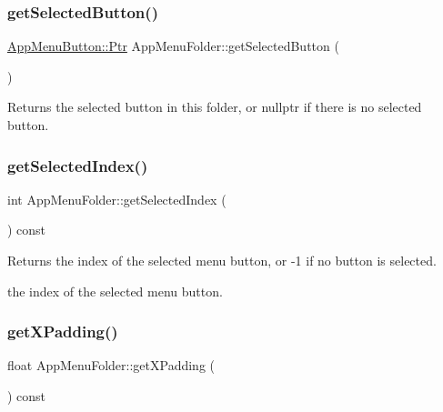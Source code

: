 \subsubsection{\texorpdfstring{get\+Selected\+Button()}{getSelectedButton()}}
{\footnotesize\ttfamily \mbox{\hyperlink{classAppMenuButton_aeb692efb6a933970de8eac14e5e71544}{App\+Menu\+Button\+::\+Ptr}} App\+Menu\+Folder\+::get\+Selected\+Button (\begin{DoxyParamCaption}{ }\end{DoxyParamCaption})}

\begin{DoxyReturn}{Returns}
the selected button in this folder, or nullptr if there is no selected button. 
\end{DoxyReturn}
\mbox{\label{classAppMenuFolder_adb267a2cbeeb2f32251bda3ec8010d62}} 
\subsubsection{\texorpdfstring{get\+Selected\+Index()}{getSelectedIndex()}}
{\footnotesize\ttfamily int App\+Menu\+Folder\+::get\+Selected\+Index (\begin{DoxyParamCaption}{ }\end{DoxyParamCaption}) const}

\begin{DoxyReturn}{Returns}
the index of the selected menu button, or -\/1 if no button is selected.

the index of the selected menu button. 
\end{DoxyReturn}
\mbox{\label{classAppMenuFolder_a9a6361cc4669dfaaf08159b09cddfe3e}} 
\subsubsection{\texorpdfstring{get\+X\+Padding()}{getXPadding()}}
{\footnotesize\ttfamily float App\+Menu\+Folder\+::get\+X\+Padding (\begin{DoxyParamCaption}{ }\end{DoxyParamCaption}) const}

